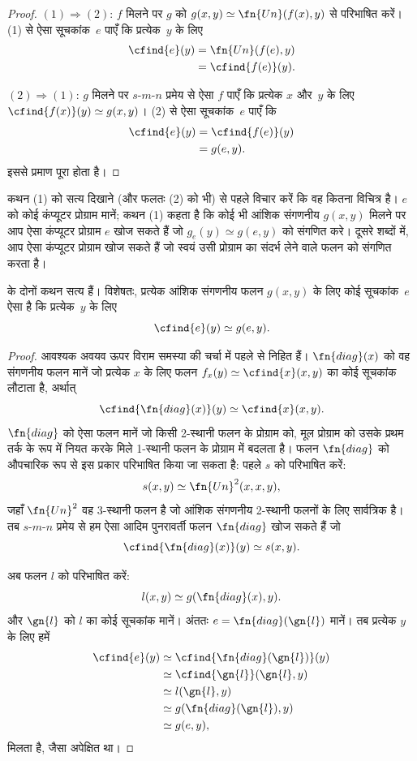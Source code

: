 \documentclass[../../../include/open-logic-section]{subfiles}
\begin{document}
\begin{proof}
$(1) \Rightarrow (2)$: $f$ मिलने पर $g$ को $g(x,y) \simeq
\fn{Un}(f(x),y)$ से परिभाषित करें। (1) से ऐसा सूचकांक~$e$ पाएँ कि
प्रत्येक~$y$ के लिए
\begin{align*}
\cfind{e}(y) & = \fn{Un}(f(e),y) \\
& = \cfind{f(e)}(y).
\end{align*}

$(2) \Rightarrow (1)$: $g$ मिलने पर $s$-$m$-$n$ प्रमेय से ऐसा $f$ पाएँ
कि प्रत्येक $x$ और~$y$ के लिए $\cfind{f(x)}(y) \simeq g(x,y)$। (2) से
ऐसा सूचकांक~$e$ पाएँ कि
\begin{align*}
\cfind{e}(y) & = \cfind{f(e)}(y) \\
& = g(e,y).
\end{align*}
इससे प्रमाण पूरा होता है।
\end{proof}

\begin{explain}
कथन (1) को सत्य दिखाने (और फलतः (2) को भी) से पहले विचार करें कि वह
कितना विचित्र है। $e$ को कोई कंप्यूटर प्रोग्राम मानें; कथन (1) कहता है
कि कोई भी आंशिक संगणनीय $g(x,y)$ मिलने पर आप ऐसा कंप्यूटर प्रोग्राम $e$
खोज सकते हैं जो $g_e(y) \simeq g(e,y)$ को संगणित करे। दूसरे शब्दों में,
आप ऐसा कंप्यूटर प्रोग्राम खोज सकते हैं जो स्वयं उसी प्रोग्राम का संदर्भ
लेने वाले फलन को संगणित करता है।
\end{explain}

\begin{thm}
 के दोनों कथन सत्य हैं। विशेषतः, प्रत्येक आंशिक
संगणनीय फलन $g(x,y)$ के लिए कोई सूचकांक~$e$ ऐसा है कि प्रत्येक~$y$ के लिए
\[
\cfind{e}(y) \simeq g(e,y).
\]
\end{thm}

\begin{proof}
आवश्यक अवयव ऊपर विराम समस्या की चर्चा में पहले से निहित हैं।
$\fn{diag}(x)$ को वह संगणनीय फलन मानें जो प्रत्येक $x$ के लिए फलन
$f_x(y) \simeq \cfind{x}(x,y)$ का कोई सूचकांक लौटाता है, अर्थात्
\[
\cfind{\fn{diag}(x)}(y) \simeq \cfind{x}(x,y).
\]
$\fn{diag}$ को ऐसा फलन मानें जो किसी 2-स्थानी फलन के प्रोग्राम को, मूल
प्रोग्राम को उसके प्रथम तर्क के रूप में नियत करके मिले 1-स्थानी फलन के
प्रोग्राम में बदलता है। फलन $\fn{diag}$ को औपचारिक रूप से इस प्रकार
परिभाषित किया जा सकता है: पहले $s$ को परिभाषित करें:
\[
s(x,y) \simeq \fn{Un}^2(x,x,y),
\]
जहाँ $\fn{Un}^2$ वह 3-स्थानी फलन है जो आंशिक संगणनीय 2-स्थानी फलनों के
लिए सार्वत्रिक है। तब $s$-$m$-$n$ प्रमेय से हम ऐसा आदिम पुनरावर्ती फलन
$\fn{diag}$ खोज सकते हैं जो
\[
\cfind{\fn{diag}(x)}(y) \simeq s(x,y).
\]

अब फलन $l$ को परिभाषित करें:
\[
l(x,y) \simeq g(\fn{diag}(x),y).
\]
और $\gn{l}$ को $l$ का कोई सूचकांक मानें। अंततः
$e = \fn{diag}(\gn{l})$ मानें। तब प्रत्येक $y$ के लिए हमें
\begin{align*}
\cfind{e}(y) & \simeq \cfind{\fn{diag}(\gn{l})}(y) \\
& \simeq \cfind{\gn{l}}(\gn{l}, y) \\
& \simeq l(\gn{l}, y) \\
& \simeq g(\fn{diag}(\gn{l}),y) \\
& \simeq g(e, y),
\end{align*}
मिलता है, जैसा अपेक्षित था।
\end{proof}
\end{document}
